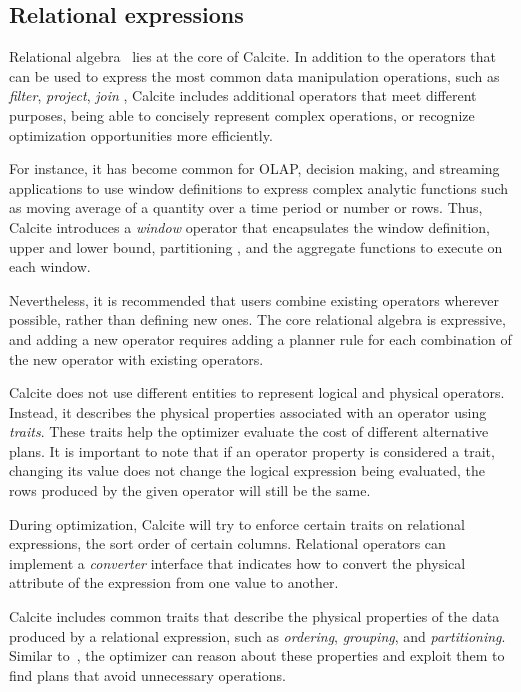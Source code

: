 \subsection{Relational expressions}
\label{subsec:relexprs}

Relational algebra~\cite{DBLP:journals/cacm/Codd70} lies at the core of Calcite. In addition to the operators that can be used to express the most common data manipulation operations, such as \textit{filter}, \textit{project}, \textit{join} \etc , Calcite includes additional operators that meet different purposes, \eg being able to concisely represent complex operations, or recognize optimization opportunities more efficiently.

For instance, it has become common for OLAP, decision making, and streaming applications to use window definitions to express complex analytic functions such as moving average of a quantity over a time period or number or rows.  Thus, Calcite introduces a \textit{window} operator that encapsulates the window definition, \ie upper and lower bound, partitioning \etc, and the aggregate functions to execute on each window.

Nevertheless, it is recommended that users combine existing operators wherever possible, rather than defining new ones. The core relational algebra is expressive, and adding a new operator requires adding a planner rule for each combination of the new operator with existing operators.

 Calcite does not use different entities to represent logical and physical operators. Instead, it describes the physical properties associated with an operator using \textit{traits}. These traits help the optimizer evaluate the cost of different alternative plans. It is important to note that if an operator property is considered a trait, changing its value does not change the logical expression being evaluated, \ie the rows produced by the given operator will still be the same.

During optimization, Calcite will try to enforce certain traits on relational expressions, \eg the sort order of certain columns. Relational operators can implement a \textit{converter} interface that indicates how to convert the physical attribute of the expression from one value to another.

Calcite includes common traits that describe the physical properties of the data produced by a relational expression, such as \textit{ordering}, \textit{grouping}, and \textit{partitioning}. Similar to~\cite{DBLP:conf/icde/ZhouLC10}, the optimizer can reason about these properties and exploit them to find plans that avoid unnecessary operations.

